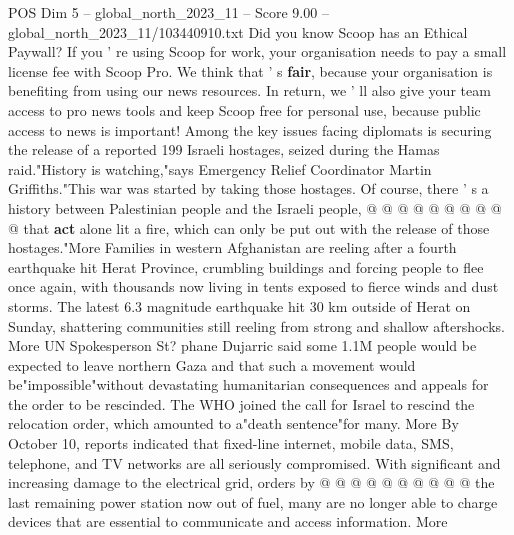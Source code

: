 \begin{textsample}{POS Dim 5 – global\_north\_2023\_11 – Score 9.00 – global\_north\_2023\_11/103440910.txt}
Did you know Scoop has an Ethical Paywall?
If you ' re using Scoop for work, your organisation needs to pay a small license fee with Scoop Pro.
We think that ' s \textbf{fair}, because your organisation is benefiting from using our news resources.
In return, we ' ll also give your team access to pro news tools and keep Scoop free for personal use, because public access to news is important!
Among the key issues facing diplomats is securing the release of a reported 199 Israeli hostages, seized during the Hamas raid."History is watching,"says Emergency Relief Coordinator Martin Griffiths."This war was started by taking those hostages.
Of course, there ' s a history between Palestinian people and the Israeli people, @ @ @ @ @ @ @ @ @ @ that \textbf{act} alone lit a fire, which can only be put out with the release of those hostages."More Families in western Afghanistan are reeling after a fourth earthquake hit Herat Province, crumbling buildings and forcing people to flee once again, with thousands now living in tents exposed to fierce winds and dust storms.
The latest 6.3 magnitude earthquake hit 30 km outside of Herat on Sunday, shattering communities still reeling from strong and shallow aftershocks.
More UN Spokesperson St? phane Dujarric said some 1.1M people would be expected to leave northern Gaza and that such a movement would be"impossible"without devastating humanitarian consequences and appeals for the order to be rescinded.
The WHO joined the call for Israel to rescind the relocation order, which amounted to a"death sentence"for many.
More By October 10, reports indicated that fixed-line internet, mobile data, SMS, telephone, and TV networks are all seriously compromised.
With significant and increasing damage to the electrical grid, orders by @ @ @ @ @ @ @ @ @ @ the last remaining power station now out of fuel, many are no longer able to charge devices that are essential to communicate and access information.
More

\end{textsample}
